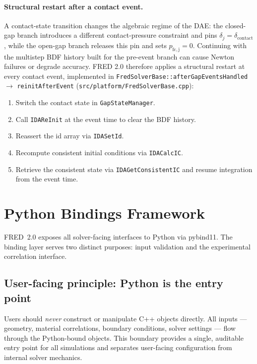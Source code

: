 \documentclass[11pt,a4paper]{article}
\begin{document}
\paragraph{Structural restart after a contact event.}
A contact-state transition changes the algebraic regime of the DAE: the closed-gap branch introduces a different contact-pressure constraint and pins $\delta_j = \delta_\mathrm{contact}$, while the open-gap branch releases this pin and sets $p_\mathrm{fc,j} = 0$.  Continuing with the multistep BDF history built for the pre-event branch can cause Newton failures or degrade accuracy.  FRED 2.0 therefore applies a structural restart at every contact event, implemented in \texttt{FredSolverBase::afterGapEventsHandled} $\to$ \texttt{reinitAfterEvent} (\texttt{src/platform/FredSolverBase.cpp}):
\begin{enumerate}
  \item Switch the contact state in \texttt{GapStateManager}.
  \item Call \texttt{IDAReInit} at the event time to clear the BDF history.
  \item Reassert the id array via \texttt{IDASetId}.
  \item Recompute consistent initial conditions via \texttt{IDACalcIC}.
  \item Retrieve the consistent state via \texttt{IDAGetConsistentIC} and resume integration from the event time.
\end{enumerate}

\section{Python Bindings Framework}
\label{sec:python_bindings}

FRED~2.0 exposes all solver-facing interfaces to Python via pybind11.  The binding layer serves two distinct purposes: input validation and the experimental correlation interface.

\subsection{User-facing principle: Python is the entry point}

Users should \emph{never} construct or manipulate C++ objects directly.  All inputs --- geometry, material correlations, boundary conditions, solver settings --- flow through the Python-bound objects.  This boundary provides a single, auditable entry point for all simulations and separates user-facing configuration from internal solver mechanics.
\end{document}
